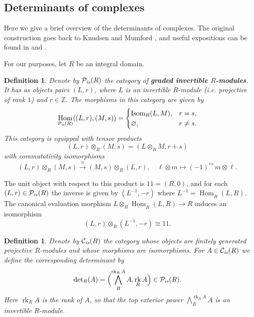 \documentclass[10pt,a4paper,oneside,draft]{article}
\DeclareMathOperator{\Hom}{Hom}
\DeclareMathOperator{\Isom}{Isom}
\DeclareMathOperator{\rk}{rk}
\newcommand{\ZZ}{\mathbb{Z}}
\newcommand{\bone}{1\!\!1}
\renewcommand{\det}{\operatorname{det}}
\renewcommand{\emptyset}{\varnothing}
\newcommand{\is}{\text{\it is}}
\newcommand{\iHom}{\underline{\Hom}}
\theoremstyle{myplain}
\theoremstyle{mydefinition}
\newtheorem{definition}[theorem]{Definition}
\numberwithin{equation}{section}
\begin{document}
\begin{appendices}
\section{Determinants of complexes}
\label{app:determinants}

Here we give a brief overview of the determinants of complexes. The original
construction goes back to Knudsen and Mumford \cite{Knudsen-Mumford-1976}, and
useful expositions can be found in
\cite[Appendix~A]{Gelfand-Kapranov-Zelevinsky-1994} and \cite[\S
2.1]{Kato-1993}.

For our purposes, let $R$ be an integral domain.

\begin{definition}
  Denote by $\mathcal{P}_\is (R)$ the category of
  \textbf{graded invertible $R$-modules}. It has as objects pairs $(L,r)$, where
  $L$ is an invertible $R$-module (i.e. projective of rank $1$) and
  $r \in \ZZ$. The morphisms in this category are given by
  \[ \Hom_{\mathcal{P}_\is (R)} ((L,r), (M,s)) = \begin{cases}
      \Isom_R (L,M), & r = s, \\
      \emptyset, & r \ne s.
    \end{cases} \]
  This category is equipped with tensor products
  $$(L,r) \otimes_R (M,s) = (L\otimes_R M, r + s)$$
  with commutativity isomorphisms
  \[
    (L,r) \otimes_R (M,s)
    \xrightarrow{\cong}
    (M,s) \otimes_R (L,r),
    \quad
    \ell \otimes m \mapsto (-1)^{rs}\,m\otimes \ell.
  \]
\end{definition}

The unit object with respect to this product is $\bone = (R,0)$, and for each
$(L,r) \in \mathcal{P}_\is (R)$ the inverse is given by $(L^{-1}, -r)$ where
$L^{-1} = \iHom_R (L,R)$. The canonical evaluation morphism
$L \otimes_R \iHom_R (L,R) \to R$ induces an isomorphism
$$(L,r) \otimes_R (L^{-1}, -r) \cong \bone.$$

\begin{definition}
  Denote by $\mathcal{C}_\is (R)$ the category whose objects are finitely
  generated projective $R$-modules and whose morphisms are isomorphisms.
  For $A \in \mathcal{C}_\is (R)$ we define the corresponding determinant by
  \begin{equation}
    \label{eqn:det-proj-module}
    \det_R (A) = \Bigl(\bigwedge^{\rk_R A}_R A, \rk_R A\Bigr) \in \mathcal{P}_\is (R).
  \end{equation}
  Here $\rk_R A$ is the rank of $A$, so that the top exterior power
  $\bigwedge^{\rk_R A}_R A$ is an invertible $R$-module.
\end{definition}


\end{appendices}
\end{document}
